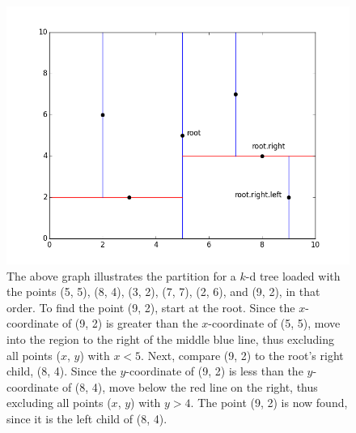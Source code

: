 \begin{figure}[H]
\includegraphics[width=.9\textwidth]{figures/kdpic1.png}
\caption{The above graph illustrates the partition for a $k$-d tree loaded with the points (5, 5), (8, 4), (3, 2), (7, 7), (2, 6), and (9, 2), in that order. To find the point (9, 2), start at the root. Since the $x$-coordinate of (9, 2) is greater than the $x$-coordinate of (5, 5), move into the region to the right of the middle blue line, thus excluding all points ($x$, $y$) with $x < 5$. Next, compare (9, 2) to the root's right child, (8, 4). Since the $y$-coordinate of (9, 2) is less than the $y$-coordinate of (8, 4), move below the red line on the right, thus excluding all points ($x$, $y$) with $y > 4$. The point (9, 2) is now found, since it is the left child of (8, 4).}
\label{fig:k-binary-search}
\end{figure}

